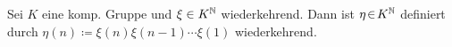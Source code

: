 \documentclass{cheat-sheet}
\begin{document}

\begin{prop}
  Sei $K$ eine komp. Gruppe und $\xi \in K^{\mathbb{N}}$ wiederkehrend. Dann ist $\eta \!\in\! K^{\mathbb{N}}$ definiert durch $\eta(n) \coloneqq \xi(n) \xi(n-1) \cdots \xi(1)$ wiederkehrend.
\end{prop}


\end{document}
